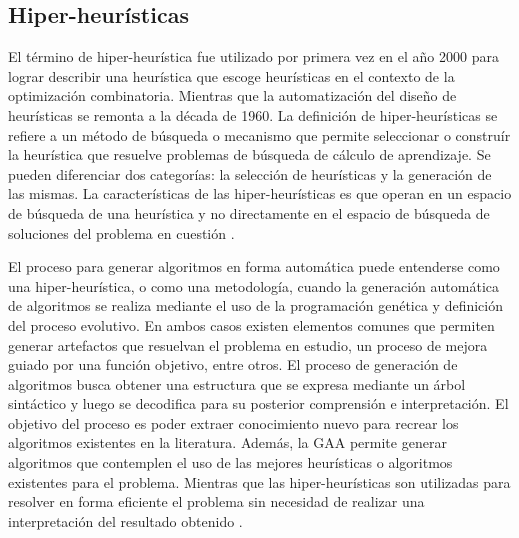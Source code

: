 \subsection{Hiper-heurísticas}

El término de hiper-heurística fue utilizado por primera vez en el año 2000 para lograr describir una heurística que escoge heurísticas en el contexto de la optimización combinatoria. Mientras que la automatización del diseño de heurísticas se remonta a la década de 1960. La definición de hiper-heurísticas  se refiere a un método de búsqueda o mecanismo que permite seleccionar o construír la heurística que resuelve problemas de búsqueda de cálculo de aprendizaje. Se pueden diferenciar dos categorías: la selección de heurísticas y la generación de las mismas. La características de las hiper-heurísticas es que operan en un espacio de búsqueda de una heurística y no directamente en el espacio de búsqueda de soluciones del problema en cuestión \citep{burke_2013}.

El proceso para generar algoritmos en forma automática puede entenderse como una hiper-heurística, o como una metodología, cuando la generación automática de algoritmos se realiza mediante el uso de la programación genética y definición del proceso evolutivo. En ambos casos existen elementos comunes que permiten generar artefactos que resuelvan el problema en estudio, un proceso de mejora guiado por una función objetivo, entre otros. El proceso de generación de algoritmos busca obtener una estructura que se expresa mediante un árbol sintáctico y luego se decodifica para su posterior comprensión e interpretación. El objetivo del proceso es poder extraer conocimiento nuevo para recrear los algoritmos existentes en la literatura. Además, la GAA permite generar algoritmos que contemplen el uso de las mejores heurísticas o algoritmos existentes para el problema. Mientras que las hiper-heurísticas son utilizadas para resolver en forma eficiente el problema sin necesidad de realizar una interpretación del resultado obtenido \citep{burke_2013}.


